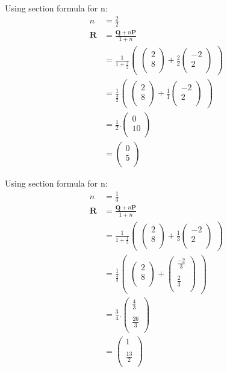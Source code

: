 \documentclass[12pt]{article}
\newcommand{\myvec}[1]{\ensuremath{\begin{pmatrix}#1\end{pmatrix}}}
\let\vec\mathbf
\begin{document}
Using section formula for n:
\begin{align}
n&=\frac{2}{2}\\
\vec{R}&=\frac{\vec{Q}+n\vec{P}}{1+n}\\
&=\frac{1}{1+\frac{2}{2}}  \myvec{\myvec{
2\\
8\\
}
  +
   \frac{2}{2}\myvec{
-2\\
2\\
}}\\
&= \frac{1}{\frac{4}{2}} \myvec{\myvec{
2\\
8\\
}
  +
\frac{1}{1}\myvec{
-2\\
2\\
}} \\
&=\frac{1}{2}.
\myvec{
0\\
10\\
}\\
&=\myvec{
0\\
5\\
}
\end{align}

Using section formula for n:
\begin{align}
n&=\frac{1}{3}\\
\vec{R}&=\frac{\vec{Q}+n\vec{P}}{1+n}\\
&=\frac{1}{1+\frac{1}{3}}  \myvec{\myvec{
2\\
8\\
}
  +
   \frac{1}{3}\myvec{
-2\\
2\\
}}\\
&= \frac{1}{\frac{4}{3}} \myvec{\myvec{
2\\
8\\
}
  +
\myvec{
\frac{-2}{3}\\
\\
\frac{2}{3}\\
}} \\
&=\frac{3}{4}.
\myvec{
\frac{4}{3}\\
\\
\frac{26}{3}\\
}\\
&=\myvec{
1\\
\\
\frac{13}{2}\\
}
\end{align}
\end{document}
